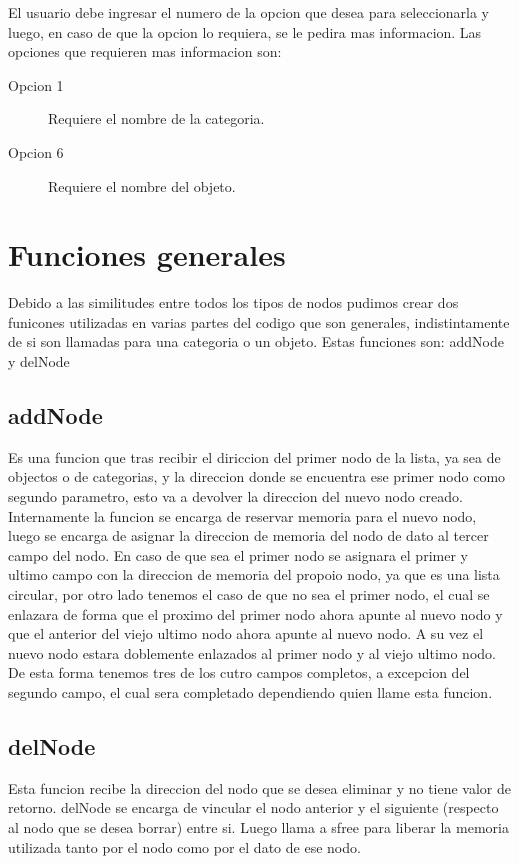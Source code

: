 \documentclass[]{article}
\begin{document}
El usuario debe ingresar el numero de la opcion que desea para seleccionarla y luego, en caso de que la opcion lo requiera, se le pedira mas informacion. Las opciones que requieren mas informacion son:

\begin {description}
\item [Opcion 1] Requiere el nombre de la categoria.
\item [Opcion 6] Requiere el nombre del objeto.
\end{description}

\section{Funciones generales}

Debido a las similitudes entre todos los tipos de nodos pudimos crear dos funicones utilizadas en varias partes del codigo que son generales, indistintamente de si son llamadas para una categoria o un objeto. Estas funciones son: addNode y delNode 

\subsection{addNode}

Es una funcion que tras recibir el diriccion del primer nodo de la lista, ya sea de objectos o de categorias, y la direccion donde se encuentra ese primer nodo como segundo parametro, esto va a devolver la direccion del nuevo nodo creado.\\

Internamente la funcion se encarga de reservar memoria para el nuevo nodo, luego se encarga de asignar la direccion de memoria del nodo de dato al tercer campo del nodo. En caso de que sea el primer nodo se asignara el primer y ultimo campo con la direccion de memoria del propoio nodo, ya que es una lista circular, por otro lado tenemos el caso de que no sea el primer nodo, el cual se enlazara de forma que el proximo del primer nodo ahora apunte al nuevo nodo y que el anterior del viejo ultimo nodo ahora apunte al nuevo nodo. A su vez el nuevo nodo estara doblemente enlazados al primer nodo y al viejo ultimo nodo.\\

De esta forma tenemos tres de los cutro campos completos, a excepcion del segundo campo, el cual sera completado dependiendo quien llame esta funcion.\\

\subsection{delNode}
Esta funcion recibe la direccion del nodo que se desea eliminar y no tiene valor de retorno. delNode se encarga de vincular el nodo anterior y el siguiente (respecto al nodo que se desea borrar) entre si. Luego llama a sfree para liberar la memoria utilizada tanto por el nodo como por el dato de ese nodo.\\
\end{document}
